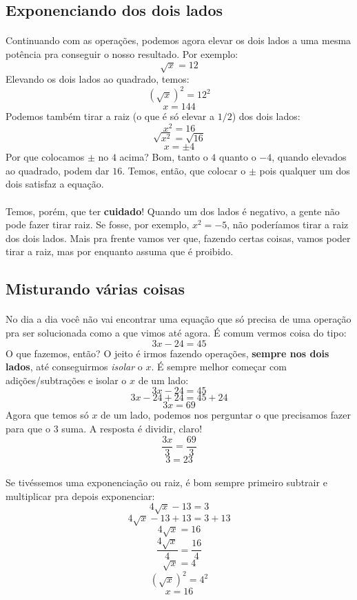 \documentclass[11pt]{article}
\begin{document}
\subsection{Exponenciando dos dois lados}
\paragraph{}
Continuando com as operações, podemos agora elevar os dois lados a uma mesma
potência pra conseguir o nosso resultado. Por exemplo:
$$\sqrt{x} = 12$$
Elevando os dois lados ao quadrado, temos:
$${(\sqrt{x})}^2 = 12^2$$
$$x = 144$$
Podemos também tirar a raiz (o que é só elevar a $1/2$) dos dois lados:
$$x^2 = 16$$
$$\sqrt{x^2} = \sqrt{16}$$
$$x = \pm4$$
Por que colocamos $\pm$ no $4$ acima? Bom, tanto o $4$ quanto o $-4$, quando
elevados ao quadrado, podem dar $16$. Temos, então, que colocar o $\pm$ pois
qualquer um dos dois satisfaz a equação.
\paragraph{}
Temos, porém, que ter \textbf{cuidado}! Quando um dos lados é negativo, a gente
não pode fazer tirar raiz. Se fosse, por exemplo, $x^2 = -5$, não poderíamos 
tirar a raiz dos dois lados. Mais pra frente vamos ver que, fazendo certas 
coisas, vamos poder tirar a raiz, mas por enquanto assuma que é proibido.

\subsection{Misturando várias coisas}
\paragraph{}
No dia a dia você não vai encontrar uma equação que só precisa de uma operação
pra ser solucionada como a que vimos até agora. É comum vermos coisa do tipo:
$$3x - 24 = 45$$
O que fazemos, então? O jeito é irmos fazendo operações, \textbf{sempre nos
dois lados}, até conseguirmos \emph{isolar} o $x$. É sempre melhor começar com
adições/subtrações e isolar o $x$ de um lado:
$$3x - 24 = 45$$
$$3x - 24 + 24 = 45 + 24$$
$$3x = 69$$
Agora que temos só $x$ de um lado, podemos nos perguntar o que precisamos fazer
para que o $3$ suma. A resposta é dividir, claro!
$$\frac{3x}{3} = \frac{69}{3}$$
$$3 = 23$$
\paragraph{}
Se tivéssemos uma exponenciação ou raiz, é bom sempre primeiro subtrair e
multiplicar pra depois exponenciar:
$$4\sqrt{x} - 13 = 3$$
$$4\sqrt{x}- 13 + 13 = 3 + 13$$
$$4\sqrt{x} = 16$$
$$\frac{4\sqrt{x}}{4} = \frac{16}{4}$$
$$\sqrt{x}= 4$$
$${(\sqrt{x})}^2 = 4^2$$
$$x = 16$$
\end{document}

